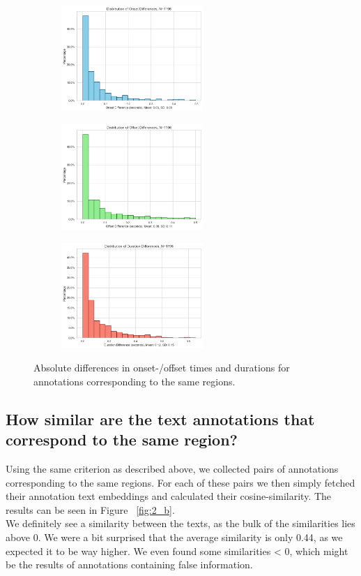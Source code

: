\begin{figure}[htbp]
  \centering
  \begin{subfigure}[b]{0.33\textwidth}
    \includegraphics[width=\textwidth, height=4cm]{figs/onset_diffs.png}
  \end{subfigure}
  \hfill
  \begin{subfigure}[b]{0.33\textwidth}
    \includegraphics[width=\textwidth, height=4cm]{figs/offset_diffs.png}
  \end{subfigure}
  \hfill
  \begin{subfigure}[b]{0.33\textwidth}
    \includegraphics[width=\textwidth, height=4cm]{figs/duration_diffs.png}
  \end{subfigure}
  \caption{Absolute differences in onset-/offset times and durations for annotations corresponding to the same regions.}
  \label{fig:2_a}
\end{figure}

\subsection{How similar are the text annotations that correspond to the same region?}
\label{sec:Annotation Quality:b1}
Using the same criterion as described above, we collected pairs of annotations corresponding to the same regions. For each of these pairs we then simply fetched their annotation text embeddings and calculated their cosine-similarity. The results can be seen in Figure ~\ref{fig:2_b}. \\
We definitely see a similarity between the texts, as the bulk of the similarities lies above 0. We were a bit surprised that the average similarity is only 0.44, as we expected it to be way higher. We even found some similarities < 0, which might be the results of annotations containing false information.


